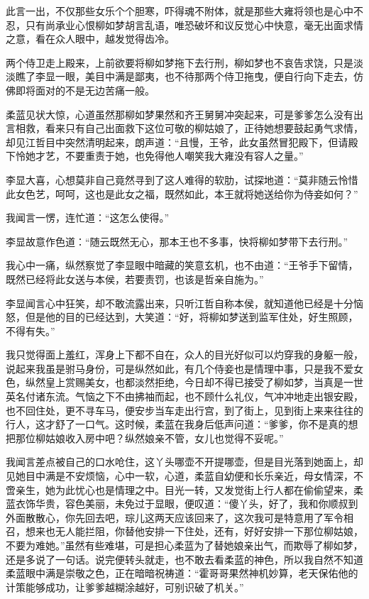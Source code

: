 此言一出，不仅那些女乐个个胆寒，吓得魂不附体，就是那些大雍将领也是心中不忍，只有尚承业心恨柳如梦胡言乱语，唯恐破坏和议反觉心中快意，毫无出面求情之意，看在众人眼中，越发觉得齿冷。

两个侍卫走上殿来，上前欲要将柳如梦拖下去行刑，柳如梦也不哀告求饶，只是淡淡瞧了李显一眼，美目中满是鄙夷，也不待那两个侍卫拖曳，便自行向下走去，仿佛即将面对的不是无边苦痛一般。

柔蓝见状大惊，心道虽然那柳如梦果然和齐王舅舅冲突起来，可是爹爹怎么没有出言相救，看来只有自己出面救下这位可敬的柳姑娘了，正待她想要鼓起勇气求情，却见江哲目中突然清明起来，朗声道：“且慢，王爷，此女虽然冒犯殿下，但请殿下怜她才艺，不要重责于她，也免得他人嘲笑我大雍没有容人之量。”

李显大喜，心想莫非自己竟然寻到了这人难得的软肋，试探地道：“莫非随云怜惜此女色艺，呵呵，这也是此女之福，既然如此，本王就将她送给你为侍妾如何？”

我闻言一愣，连忙道：“这怎么使得。”

李显故意作色道：“随云既然无心，那本王也不多事，快将柳如梦带下去行刑。”

我心中一痛，纵然察觉了李显眼中暗藏的笑意玄机，也不由道：“王爷手下留情，既然已经将此女送与本侯，若要责罚，也该是哲亲自施为。”

李显闻言心中狂笑，却不敢流露出来，只听江哲自称本侯，就知道他已经是十分恼怒，但是他的目的已经达到，大笑道：“好，将柳如梦送到监军住处，好生照顾，不得有失。”

我只觉得面上羞红，浑身上下都不自在，众人的目光好似可以灼穿我的身躯一般，说起来我虽是驸马身份，可是纵然如此，有几个侍妾也是情理中事，只是我不爱女色，纵然皇上赏赐美女，也都淡然拒绝，今日却不得已接受了柳如梦，当真是一世英名付诸东流。气恼之下不由拂袖而起，也不顾什么礼仪，气冲冲地走出银安殿，也不回住处，更不寻车马，便安步当车走出行宫，到了街上，见到街上来来往往的行人，这才舒了一口气。这时候，柔蓝在我身后低声问道：“爹爹，你不是真的想把那位柳姑娘收入房中吧？纵然娘亲不管，女儿也觉得不妥呢。”

我闻言差点被自己的口水呛住，这丫头哪壶不开提哪壶，但是目光落到她面上，却见她目中满是不安烦恼，心中一软，心道，柔蓝自幼便和长乐亲近，母女情深，不啻亲生，她为此忧心也是情理之中。目光一转，又发觉街上行人都在偷偷望来，柔蓝衣饰华贵，容色美丽，未免过于显眼，便叹道：“傻丫头，好了，我和你顺叔到外面散散心，你先回去吧，琮儿这两天应该回来了，这次我可是特意用了军令相召，想来也无人能拦阻，你替他安排一下住处，还有，好好安排一下那位柳姑娘，不要为难她。”虽然有些难堪，可是担心柔蓝为了替她娘亲出气，而欺辱了柳如梦，还是多说了一句话。说完便转头就走，也不敢去看柔蓝的神色，所以我自然不知道柔蓝眼中满是崇敬之色，正在暗暗祝祷道：“霍哥哥果然神机妙算，老天保佑他的计策能够成功，让爹爹越糊涂越好，可别识破了机关。”

